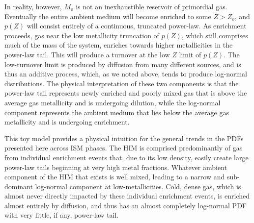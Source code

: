 \documentclass[twocolumn]{aastex61}
\begin{document}
In reality, however, $M_o$ is not an inexhaustible reservoir of primordial gas. Eventually the entire ambient medium will become enriched to some $Z > Z_o$, and $p(Z)$ will consist entirely of a continuous, truncated power-law. As enrichment proceeds, gas near the low metallicity truncation of $p(Z)$, which still comprises much of the mass of the system, enriches towards higher metallicities in the power-law tail. This will produce a turnover at the low $Z$ limit of $p(Z)$. The low-turnover limit is produced by diffusion from many different sources, and is thus an additive process, which, as we noted above, tends to produce log-normal distributions. The physical interpretation of these two components is that the power-law tail represents newly enriched and poorly mixed gas that is above the average gas metallicity and is undergoing dilution, while the log-normal component represents the ambient medium that lies below the average gas metallicity and is undergoing enrichment.

This toy model provides a physical intuition for the general trends in the PDFs presented here across ISM phases. The HIM is comprised predominantly of gas from individual enrichment events that, due to its low density, easily create large power-law tails beginning at very high metal fractions. Whatever ambient component of the HIM that exists is well mixed, leading to a narrow and sub-dominant log-normal component at low-metallicities. Cold, dense gas, which is almost never directly impacted by these individual enrichment events, is enriched almost entirely by diffusion, and thus has an almost completely log-normal PDF with very little, if any, power-law tail. 

%
%
%
\end{document}

